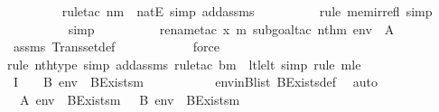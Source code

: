 \begin{isabellebody}
\ \ \ \ \ \ \ \ \isamarkupfalse%
{\isacharparenleft}{\kern0pt}rule{\isacharunderscore}{\kern0pt}tac\ n{\isacharequal}{\kern0pt}m\ \ natE{\isacharcomma}{\kern0pt}\ simp\ add{\isacharcolon}{\kern0pt}assms{}{\isacharparenright}{\kern0pt}\isanewline
\ \ \ \ \ \ \ \ \ \isamarkupfalse%
{\isacharparenleft}{\kern0pt}rule\ mem{\isacharunderscore}{\kern0pt}irrefl{\isacharcomma}{\kern0pt}\ simp{\isacharparenright}{\kern0pt}\isanewline
\ \ \ \ \ \ \ \ \isamarkupfalse%
\ simp\ \isanewline
\ \ \ \ \ \ \ \ \isamarkupfalse%
{\isacharparenleft}{\kern0pt}rename{\isacharunderscore}{\kern0pt}tac\ x\ m{\isacharprime}{\kern0pt}{\isacharcomma}{\kern0pt}\ subgoal{\isacharunderscore}{\kern0pt}tac\ {\isachardoublequoteopen}nth{\isacharparenleft}{\kern0pt}m{\isacharprime}{\kern0pt}{\isacharcomma}{\kern0pt}\ env{\isacharparenright}{\kern0pt}\ {\isasymin}\ A{\isachardoublequoteclose}{\isacharparenright}{\kern0pt}\ \isanewline
\ \ \ \ \ \ \ \ \isamarkupfalse%
\ assms\ Transset{\isacharunderscore}{\kern0pt}def\ \isanewline
\ \ \ \ \ \ \ \ \ \isamarkupfalse%
\ force\isanewline
\ \ \ \ \ \ \ \ \isamarkupfalse%
{\isacharparenleft}{\kern0pt}rule\ nth{\isacharunderscore}{\kern0pt}type{\isacharcomma}{\kern0pt}\ simp\ add{\isacharcolon}{\kern0pt}assms{}{\isacharcomma}{\kern0pt}\ rule{\isacharunderscore}{\kern0pt}tac\ b{\isacharequal}{\kern0pt}m\ \ lt{\isacharunderscore}{\kern0pt}le{\isacharunderscore}{\kern0pt}lt{\isacharcomma}{\kern0pt}\ simp{\isacharcomma}{\kern0pt}\ rule\ mle{\isacharparenright}{\kern0pt}\isanewline
\ \ \ \ \ \ \ \ \isamarkupfalse%
\isanewline
\ \ \ \ \ \ \isamarkupfalse%
\ I{}\ {\isacharcolon}{\kern0pt}\ {\isachardoublequoteopen}{\isachardot}{\kern0pt}{\isachardot}{\kern0pt}{\isachardot}{\kern0pt}\ {\isasymlongleftrightarrow}\ B{\isacharcomma}{\kern0pt}\ env\ {\isasymTurnstile}\ BExists{\isacharprime}{\kern0pt}{\isacharparenleft}{\kern0pt}m{\isacharcomma}{\kern0pt}\ {\isasymphi}{\isacharparenright}{\kern0pt}{\isachardoublequoteclose}\isanewline
\ \ \ \ \ \ \ \ \isamarkupfalse%
\ envinBlist\ BExists{\isacharprime}{\kern0pt}{\isacharunderscore}{\kern0pt}def\ \isamarkupfalse%
\ auto\isanewline
\ \ \ \ \ \ \isamarkupfalse%
\ {\isachardoublequoteopen}\ A{\isacharcomma}{\kern0pt}\ env\ {\isasymTurnstile}\ BExists{\isacharprime}{\kern0pt}{\isacharparenleft}{\kern0pt}m{\isacharcomma}{\kern0pt}\ {\isasymphi}{\isacharparenright}{\kern0pt}\ {\isasymlongleftrightarrow}\ B{\isacharcomma}{\kern0pt}\ env\ {\isasymTurnstile}\ BExists{\isacharprime}{\kern0pt}{\isacharparenleft}{\kern0pt}m{\isacharcomma}{\kern0pt}\ {\isasymphi}{\isacharparenright}{\kern0pt}{\isachardoublequoteclose}\ \isanewline

\end{isabellebody}
